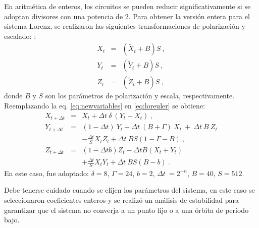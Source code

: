 En aritmética de enteros, los circuitos se pueden reducir significativamente si se adoptan divisores con una potencia de $2$.
Para obtener la versión entera para el sistema Lorenz, se realizaron las siguientes transformaciones de polarización y escalado: \cite{Gonzalez2003}:
%
\begin{eqnarray} \label{eq:newvariables}
{X}_{t}&=&\left({\widetilde X}_{t} + B\right)S \ , \nonumber \\
{Y}_{t}&=&\left({\widetilde Y}_{t} + B\right)S \ , \\
{Z}_{t}&=&\left({\widetilde Z}_{t} + B\right)S \ , \nonumber
\end{eqnarray}
%
donde $ B $ y $ S $ son los parámetros de polarización y escala, respectivamente.
Reemplazando la eq. \ref {eq:newvariables} en \ref{eq:loreuler} se obtiene:
%
\begin{eqnarray}\label{eq:Lorenz2}
{X}_{t+\Delta t}&=& {X}_{t} + \Delta t \ \delta~\left( {Y}_{t} -
{X}_{t} \right)
\ ,\nonumber \\
{Y}_{t+\Delta t}&=&(1- \Delta t )~{Y}_{t}+ \Delta t \
(B+\Gamma)~{X}_{t}~+~
\Delta t ~B~{Z}_{t} \nonumber\\
&~&-{\frac{\Delta t}{S}}{X}_{t}{Z}_{t}+ \Delta t \ BS(1-\Gamma-B) \ ,\\
{Z}_{t+\Delta t}&=&(1-\Delta t b){Z}_{t}-\Delta t B\left( {X}_{t}
+
{Y}_{t} \right)\nonumber \\
&&+{\frac{\Delta t}{S}}{X}_{t}{Y}_{t}+ \Delta t \ BS(B-b) \ .
\nonumber
\end{eqnarray}
%
En este caso, fue adoptado: $\delta=8$, $\Gamma=24$, $b=2$, $\Delta t \ =2^{-n}$, $B=40$, $S=512$.

Debe tenerse cuidado cuando se elijen los parámetros del sistema, en este caso se seleccionaron coeficientes enteros y se realizó un análisis de estabilidad para garantizar que el sistema no converja a un punto fijo o a una órbita de período bajo.

